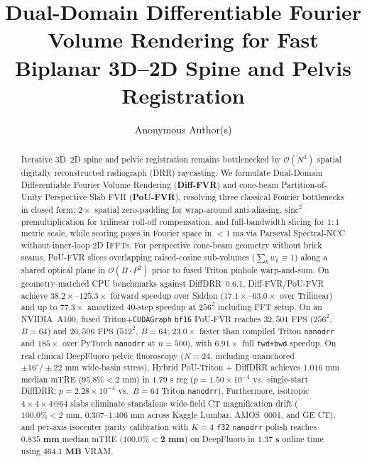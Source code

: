 \documentclass[runningheads]{llncs}
\begin{document}
\title{Dual-Domain Differentiable Fourier Volume Rendering for Fast Biplanar 3D--2D Spine and Pelvis Registration}

\author{Anonymous Author(s)}

\maketitle

\begin{abstract}
Iterative 3D--2D spine and pelvic registration remains bottlenecked by $\mathcal{O}(N^3)$ spatial digitally reconstructed radiograph (DRR) raycasting. We formulate Dual-Domain Differentiable Fourier Volume Rendering (\textbf{Diff-FVR}) and cone-beam Partition-of-Unity Perspective Slab FVR (\textbf{PoU-FVR}), resolving three classical Fourier bottlenecks in closed form: $2\times$ spatial zero-padding for wrap-around anti-aliasing, $\mathrm{sinc}^2$ premultiplication for trilinear roll-off compensation, and full-bandwidth slicing for $1:1$ metric scale, while scoring poses in Fourier space in $<1\text{ ms}$ via Parseval Spectral-NCC without inner-loop 2D IFFTs. For perspective cone-beam geometry without brick seams, PoU-FVR slices overlapping raised-cosine sub-volumes ($\sum_b w_b \equiv 1$) along a shared optical plane in $\mathcal{O}(B \cdot P^2)$ prior to fused Triton pinhole warp-and-sum. On geometry-matched CPU benchmarks against DiffDRR~0.6.1, Diff-FVR/PoU-FVR achieve $38.2\times$--$125.3\times$ forward speedup over Siddon ($17.1\times$--$63.0\times$ over Trilinear) and up to $77.3\times$ amortized 40-step speedup at $256^2$ including FFT setup. On an NVIDIA~A100, fused Triton+\texttt{CUDAGraph} \texttt{bf16} PoU-FVR reaches $32{,}501\text{ FPS}$ ($256^2$, $B{=}64$) and $26{,}506\text{ FPS}$ ($512^2$, $B{=}64$; $23.0\times$ faster than compiled Triton \texttt{nanodrr} and $185\times$ over PyTorch \texttt{nanodrr} at $n{=}500$), with $6.91\times$ full \texttt{fwd+bwd} speedup. On real clinical DeepFluoro pelvic fluoroscopy ($N{=}24$, including unanchored $\pm 16^\circ/\pm 22\text{ mm}$ wide-basin stress), Hybrid PoU-Triton + DiffDRR achieves $1.016\text{ mm}$ median mTRE ($95.8\% <2\text{ mm}$) in $1.79\text{ s}$ reg ($p=1.50\times 10^{-4}$ vs.\ single-start DiffDRR; $p=2.28\times 10^{-4}$ vs.\ $B{=}64$ Triton \texttt{nanodrr}). Furthermore, isotropic $4{\times}4{\times}4@64$ slabs eliminate standalone wide-field CT magnification drift ($100.0\% <2\text{ mm}$, $0.307$--$1.406\text{ mm}$ across Kaggle Lumbar, AMOS~0001, and GE CT), and per-axis isocenter parity calibration with $K{=}4$ \texttt{f32} \texttt{nanodrr} polish reaches $\mathbf{0.835\text{ mm}}$ median mTRE ($\mathbf{100.0\% <2\text{ mm}}$) on DeepFluoro in $\mathbf{1.37\text{ s}}$ online time using $\mathbf{464.1\text{ MB}}$ VRAM.
\end{abstract}
\end{document}
